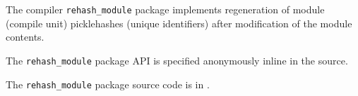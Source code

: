 
The compiler {\tt rehash\_module} package implements regeneration of module 
(compile unit) picklehashes (unique identifiers) after modification of the 
module contents.

The {\tt rehash\_module} package API is specified anonymously inline in the source.

The {\tt rehash\_module} package source code is in .




